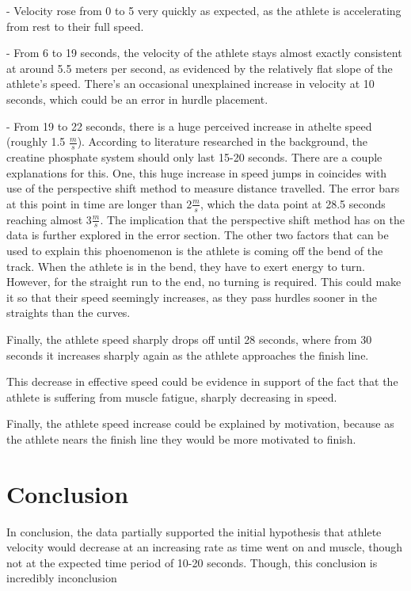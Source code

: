 \documentclass[index]{subfiles}
\begin{document}
- Velocity rose from 0 to 5 very quickly as expected, as the athlete is accelerating from rest to their full speed.

- From 6 to 19 seconds, the velocity of the athlete stays almost exactly consistent at around 5.5 meters per second, as evidenced by the relatively flat slope of the athlete's speed.  There's an occasional unexplained increase in velocity at 10 seconds, which could be an error in hurdle placement. 

- From 19 to 22 seconds, there is a huge perceived increase in athelte speed (roughly 1.5 \(\frac{m}{s}\)). According to literature researched in the background,  \parencite{martin1997better} the creatine phosphate system should only last 15-20 seconds. There are a couple explanations for this. One, this huge increase in speed jumps in coincides with use of the perspective shift method to measure distance travelled. The error bars at this point in time are longer than \(2\frac{m}{s}\), which the data point at 28.5 seconds reaching almost \(3\frac{m}{s}\). The implication that the perspective shift method has on the data is further explored in the error section. The other two factors that can be used to explain this phoenomenon is the athlete is coming off the bend of the track. When the athlete is in the bend, they have to exert energy to turn. However, for the straight run to the end, no turning is required. This could make it so that their speed seemingly increases, as they pass hurdles sooner in the straights than the curves. 


Finally, the athlete speed sharply drops off until 28 seconds, where from 30 seconds it increases sharply again as the athlete approaches the finish line. 

This decrease in effective speed could be evidence in support of the fact that the athlete is suffering from muscle fatigue, sharply decreasing in speed. 

Finally, the athlete speed increase could be explained by motivation, because as the athlete nears the finish line they would be more motivated to finish. 


\section{Conclusion}

In conclusion, the data partially supported the initial hypothesis that athlete velocity would decrease at an increasing rate as time went on and muscle, though not at the expected time period of 10-20 seconds. Though, this conclusion is incredibly inconclusion
\end{document}
